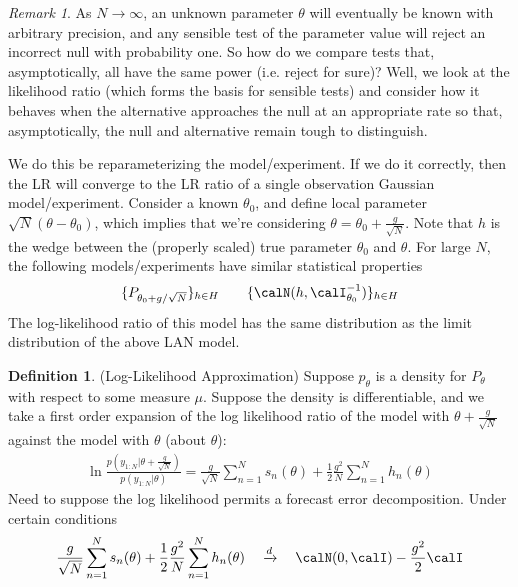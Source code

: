 \documentclass[12pt]{article}
\theoremstyle{plain}
\theoremstyle{definition}
\newtheorem{defn}[thm]{Definition}
\theoremstyle{remark}
\newtheorem*{rmk}{Remark}
\newcommand{\ra}{\rightarrow}
\newcommand{\dto}{\xrightarrow{d}}
\newcommand{\sumnN}{\sum^N_{n=1}}
\begin{document}
\begin{rmk}
As $N\ra\infty$, an unknown parameter $\theta$ will eventually be known
with arbitrary precision, and any sensible test of the parameter value
will reject an incorrect null with probability one.
So how do we compare tests that, asymptotically, all have the same power
(i.e. reject for sure)?
Well, we look at the likelihood ratio (which forms the basis for
sensible tests) and consider how it behaves when the alternative
approaches the null at an appropriate rate so that, asymptotically, the
null and alternative remain tough to distinguish.

We do this be reparameterizing the model/experiment.
If we do it correctly, then the LR will converge to the LR ratio of a
single observation Gaussian model/experiment.
Consider a known $\theta_0$, and define local parameter
$\sqrt{N}(\theta-\theta_0)$, which implies that we're considering
$\theta=\theta_0+\frac{g}{\sqrt{N}}$.
Note that $h$ is the wedge between the (properly scaled) true parameter
$\theta_0$ and $\theta$.
For large $N$, the following models/experiments have similar statistical
properties
\begin{align*}
  \{P_{\theta_0+g/\sqrt{N}}\}_{h\in H}
  \qquad
  \{\calN(h,\calI_{\theta_0}^{-1})\}_{h\in H}
\end{align*}
The log-likelihood ratio of this model has the same distribution as the
limit distribution of the above LAN model.
\end{rmk}


\begin{defn}(Log-Likelihood Approximation)
Suppose $p_\theta$ is a density for $P_\theta$ with respect to some
measure $\mu$. Suppose the density is differentiable,
and we take a first order expansion of the log likelihood ratio of the
model with $\theta+\frac{g}{\sqrt{N}}$ against the model with $\theta$
(about $\theta$):
\begin{align*}
  \ln\frac{p(y_{1:N}|\theta+\frac{g}{\sqrt{N}})}{p(y_{1:N}|\theta)}
  =
  \frac{g}{\sqrt{N}}
  \sumnN s_n(\theta)
  +
  \frac{1}{2}\frac{g^2}{N}
  \sumnN
  h_n(\theta)
\end{align*}
Need to suppose the log likelihood permits a forecast error
decomposition.
Under certain conditions
\begin{align*}
  \frac{g}{\sqrt{N}}
  \sumnN s_n(\theta)
  +
  \frac{1}{2}\frac{g^2}{N}
  \sumnN
  h_n(\theta)
  \quad\dto\quad
  \calN(0,\calI)
  -\frac{g^2}{2}
  \calI
\end{align*}
\end{defn}
\end{document}
